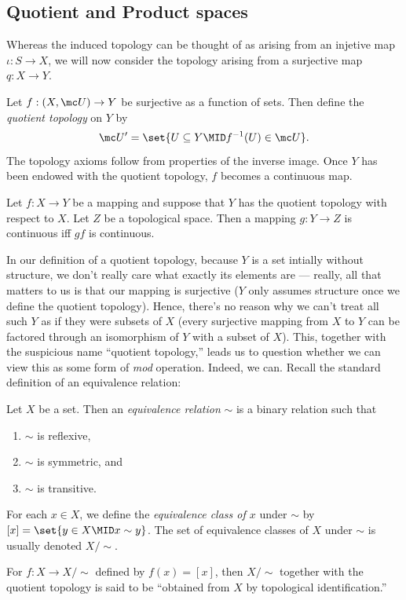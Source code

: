 \documentclass{fkbook}
\theoremstyle{snazzydefinition}
\begin{document}
\begin{adjustwidth}{1em}{1em}
  \subsection{Quotient and Product spaces}
  Whereas the induced topology can be thought of as arising from an
  injetive map $\iota : S \to X$, we will now consider the topology
  arising from a surjective map $q : X \to Y$.
  \begin{definition}
    Let $f : (X, \mc U) \to Y$ be surjective as a function of sets.
    Then define the \emph{quotient topology} on $Y$ by
    \[
      \mc U' = \set{U \subseteq Y \MID f^{-1}(U) \in \mc U}.
    \]
    The topology axioms follow from properties of the inverse image.
    Once $Y$ has been endowed with the quotient topology, $f$ becomes
    a continuous map.
  \end{definition}
  \begin{theorem}
    Let $f : X \to Y$ be a mapping and suppose that $Y$ has the
    quotient topology with respect to $X$. Let $Z$ be a topological
    space. Then a mapping $g : Y \to Z$ is continuous iff $gf$ is
    continuous.
  \end{theorem}
  In our definition of a quotient topology, because $Y$ is a set
  intially without structure, we don't really care what exactly its
  elements are --- really, all that matters to us is that our mapping
  is surjective ($Y$ only assumes structure once we define the
  quotient topology). Hence, there's no reason why we can't treat all
  such $Y$ as if they were subsets of $X$ (every surjective mapping
  from $X$ to $Y$ can be factored through an isomorphism of $Y$ with a
  subset of $X$). This, together with the suspicious name ``quotient
  topology,'' leads us to question whether we can view this as some
  form of \emph{mod} operation. Indeed, we can. Recall the standard
  definition of an equivalence relation: \clearpage
  \begin{definition}
    Let $X$ be a set. Then an \emph{equivalence relation} $\sim$ is a
    binary relation such that
    \begin{enumerate}
      \item $\sim$ is reflexive,
      \item $\sim$ is symmetric, and
      \item $\sim$ is transitive.
    \end{enumerate}
    For each $x \in X$, we define the \emph{equivalence class of $x$}
    under $\sim$ by $[x] = \set{y \in X \MID x \sim y}$. The set of
    equivalence classes of $X$ under $\sim$ is usually denoted
    $X/\sim$.
  \end{definition}
  For $f : X \to X/\sim$ defined by $f(x) = [x]$, then $X / \sim$
  together with the quotient topology is said to be ``obtained from
  $X$ by topological identification.''


\end{adjustwidth}
\end{document}
